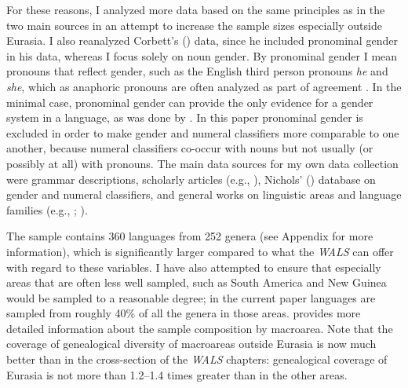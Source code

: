 \documentclass[output=collectionpaper]{langsci/langscibook}
\begin{document}
For these reasons, I analyzed more data based on the same principles as in the two main sources in an attempt to increase the sample sizes especially outside Eurasia. I also reanalyzed Corbett's (\citealt*{Corbett2013}) data, since he included pronominal gender in his data, whereas I focus solely on noun gender. By pronominal gender I mean pronouns that reflect gender, such as the English third person pronouns \textit{he} and \textit{she}, which as anaphoric pronouns are often analyzed as part of agreement \citep{Corbett2013}. In the minimal case, pronominal gender can provide the only evidence for a gender system in a language, as was done by \citet{Corbett2013}. In this paper pronominal gender is excluded in order to make gender and numeral classifiers more comparable to one another, because numeral classifiers co-occur with nouns but not usually (or possibly at all) with pronouns. The main data sources for my own data collection were grammar descriptions, scholarly articles (e.g., \citealt{Derbyshire1990}), Nichols' (\citealt*{Nichols1992}) database on gender and numeral classifiers, and general works on linguistic areas and language families (e.g., \citealt{Mithun2001}; \citealt{Janhunen2003}).

The sample contains 360 languages from 252 genera (see Appendix for more information), which is significantly larger compared to what the \textit{WALS} can offer with regard to these variables. I have also attempted to ensure that especially areas that are often less well sampled, such as South America and New Guinea would be sampled to a reasonable degree; in the current paper languages are sampled from roughly 40\% of all the genera in those areas.  provides more detailed information about the sample composition by macroarea. Note that the coverage of genealogical diversity of macroareas outside Eurasia is now much better than in the cross-section of the \textit{WALS} chapters: genealogical coverage of Eurasia is not more than 1.2--1.4 times greater than in the other areas.
\end{document}
